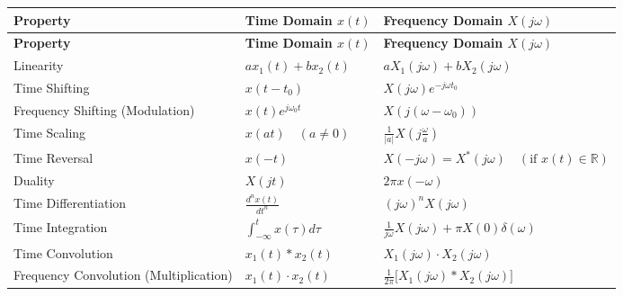 \documentclass[12pt,a4paper]{article}
\renewcommand{\arraystretch}{1.45}
\begin{document}
\par\vspace{6pt}\noindent
\begingroup
\setlength{\tabcolsep}{5pt}
\setlength{\extrarowheight}{3pt}
\renewcommand{\arraystretch}{1.4}
\begingroup
\setlength{\LTleft}{0pt}
\setlength{\LTright}{0pt}
\begin{longtable}{|B{3.8cm}|B{4.5cm}|>{\small\raggedright\arraybackslash}m{\dimexpr(\linewidth-3.8cm-4.5cm-6\arrayrulewidth)/1\relax}|}
\hline
\textbf{Property} & \textbf{Time Domain $x(t)$} & \textbf{Frequency Domain $X(j\omega)$} \\
\hline
\endfirsthead
\hline
\textbf{Property} & \textbf{Time Domain $x(t)$} & \textbf{Frequency Domain $X(j\omega)$} \\
\hline
\endhead
Linearity & $a x_1(t) + b x_2(t)$ & $a X_1(j\omega) + b X_2(j\omega)$ \\
\hline
Time Shifting & $x(t - t_0)$ & $X(j\omega) e^{-j\omega t_0}$ \\
\hline
Frequency Shifting (Modulation) & $x(t) e^{j\omega_0 t}$ & $X(j(\omega - \omega_0))$ \\
\hline
Time Scaling & $x(at) \quad (a \ne 0)$ & $\frac{1}{|a|} X\left(j\frac{\omega}{a}\right)$ \\
\hline
Time Reversal & $x(-t)$ & $X(-j\omega) = X^*(j\omega) \quad (\text{if } x(t)\in\mathbb{R})$ \\
\hline
Duality & $X(jt)$ & $2\pi x(-\omega)$ \\
\hline
Time Differentiation & $\frac{d^n x(t)}{dt^n}$ & $(j\omega)^n X(j\omega)$ \\
\hline
Time Integration & $\int_{-\infty}^t x(\tau) d\tau$ & $\frac{1}{j\omega} X(j\omega) + \pi X(0) \delta(\omega)$ \\
\hline
Time Convolution & $x_1(t) * x_2(t)$ & $X_1(j\omega) \cdot X_2(j\omega)$ \\
\hline
Frequency Convolution (Multiplication) & $x_1(t) \cdot x_2(t)$ & $\frac{1}{2\pi} \big[ X_1(j\omega) * X_2(j\omega) \big]$ \\
\hline
\end{longtable}
\endgroup
\endgroup
\end{document}
